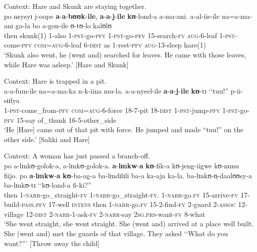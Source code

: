 \begin{exe}
\ex \label{exJaFollowingBuuka2}
Context: Hare and Skunk are staying together.\\
\gll po nsysyɪ j-oope \textbf{a}-\textbf{a}-\textbf{bʊʊk}-\textbf{ile}, \textbf{a}-\textbf{a}-\textbf{j}-\textbf{ile} \textbf{kʊ}-lond-a a-ma-ani. a-al-iis-ile na=a-ma-ani ga-la bo a-gon-ile ʊ-tʊ-lo kalʊlʊ\\
then skunk(1) 1-also 1-\textsc{pst}-go-\textsc{pfv} 1-\textsc{pst}-go-\textsc{pfv} 15-search-\textsc{fv} \textsc{aug}-6-leaf 1-\textsc{pst}-come-\textsc{pfv} \textsc{com}=\textsc{aug}-6-leaf 6-\textsc{dist} as 1-rest-\textsc{pfv} \textsc{aug}-13-sleep hare(1)\\
\glt `Skunk also went, he (went and) searched for leaves. He came with those leaves, while Hare was asleep.' [Hare and Skunk]

\ex \label{exJaNyeela}
Context: Hare is trapped in a pit.\\
\gll a-a-fum-ile na=a-ma-ka n-k-iina mu-la. a-a-nyeel-ile \textbf{a}-\textbf{a}-\textbf{j}-\textbf{ile} \textbf{kʊ}-tɪ \textup{\lq\lq}tuu!\textup{''} p-ii-sɪɪlya\\ 
1-\textsc{pst}-come\_from-\textsc{pfv} \textsc{com}=\textsc{aug}-6-force 18-7-pit 18-\textsc{dist} 1-\textsc{pst}-jump-\textsc{pfv} 1-\textsc{pst}-go-\textsc{pfv} 15-say \phantom{\lq\lq}of\_thunk 16-5-other\_side\\
\glt `He [Hare] came out of that pit with force. He jumped and made ``tuu!'' on the other side.' [Saliki and Hare]

\newpage
\ex\label{exjafika}
Context: A woman has just passed a branch-off.\\
\gll po a-lɪnkʊ-golok-a, a-lɪnkʊ-golok-a. \textbf{a}-\textbf{lɪnkw}-\textbf{a} \textbf{kʊ}-fik-a kʊ-jeng-iigwe kʊ-nunu fiijo. po \textbf{a}-\textbf{lɪnkw}-\textbf{a} \textbf{kʊ}-ba-ag-a ba-lɪndɪlɪli ba-a ka-aja ka-la. ba-lɪnkʊ-n̩-daalʊʊsy-a ba-lɪnkʊ-tɪ \textup{\lq\lq}kʊ-lond-a fi-ki?\textup{''}\\
then 1-\textsc{narr}-go\_straight-\textsc{fv} 1-\textsc{narr}-go\_straight-\textsc{fv}. 1-\textsc{narr}-go.\textsc{fv} 15-arrive-\textsc{fv} 17-build-\textsc{pass.pfv} 17-well \textsc{intens} then 1-\textsc{narr}-go.\textsc{fv} 15-2-find-\textsc{fv} 2-guard 2-\textsc{assoc} 12-village 12-\textsc{dist} 2-\textsc{narr}-1-ask-\textsc{fv} 2-\textsc{narr}-say \phantom{\lq\lq}\textsc{2sg.prs}-want-\textsc{fv} 8-what\\
\glt \lq She went straight, she went straight. She (went and) arrived at a place well built. She (went and) met the guards of that village. They asked \lq\lq What do you want?''{}' [Throw away the child]
\end{exe}

